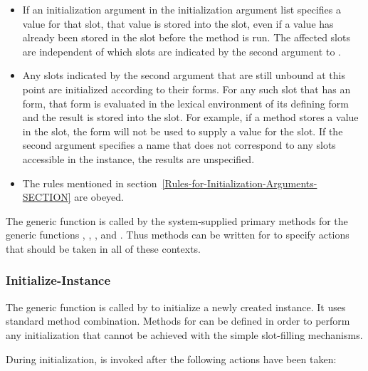\begin{itemize}
\item  If an initialization argument in the initialization
argument list specifies a value for that slot, that value is stored
into the slot, even if a value has already been stored in the slot
before the method is run.  The affected slots are independent of which
slots are indicated by the second argument to .

\item  Any slots indicated by the second argument that are still
unbound at this point are initialized according to their 
 forms.  For any such slot that has an  form,
that form is evaluated in the lexical environment of its defining 
 form and the result is stored into the slot.  For example,
if a  method stores a value in the slot, the 
 form will not be used to supply a value for the slot.  If
the second argument specifies a name that does not correspond to any
slots accessible in the instance, the results are unspecified.

\item  The rules mentioned in section~\ref{Rules-for-Initialization-Arguments-SECTION} are obeyed.

\end{itemize}

The generic function  is called by the
system-supplied primary methods for the generic functions
,
, 
, and
.
Thus methods can be written for 
 to specify actions that should be taken in all of
these contexts.

\subsubsection{Initialize-Instance}

The generic function  is called by 
 to initialize a newly created instance.  It uses
standard method combination.  Methods for 
 can be defined in order to perform any
initialization that cannot be achieved with the simple slot-filling
mechanisms.

During initialization,  is invoked
after the following actions have been taken:

